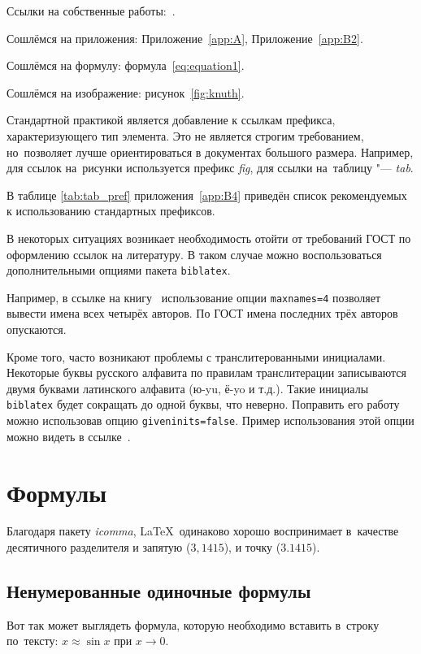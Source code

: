 Ссылки на собственные работы:~\cite{vakbib1, confbib1}.

Сошлёмся на приложения: Приложение~\cref{app:A}, Приложение~\cref{app:B2}.

Сошлёмся на формулу: формула~\cref{eq:equation1}.

Сошлёмся на изображение: рисунок~\cref{fig:knuth}.

Стандартной практикой является добавление к ссылкам префикса, характеризующего тип элемента.
Это не является строгим требованием, но~позволяет лучше ориентироваться в документах большого размера.
Например, для ссылок на~рисунки используется префикс \textit{fig},
для ссылки на~таблицу "--- \textit{tab}.

В таблице \cref{tab:tab_pref} приложения~\cref{app:B4} приведён список рекомендуемых
к использованию стандартных префиксов.

В некоторых ситуациях возникает необходимость отойти от требований ГОСТ по оформлению ссылок на
литературу.
В таком случае можно воспользоваться дополнительными опциями пакета \verb+biblatex+.

Например, в ссылке на книгу~\cite{sobenin_kdv} использование опции \verb+maxnames=4+ позволяет
вывести имена всех четырёх авторов.
По ГОСТ имена последних трёх авторов опускаются.

Кроме того, часто возникают проблемы с транслитерованными инициалами. Некоторые буквы русского
алфавита по правилам транслитерации записываются двумя буквами латинского алфавита (ю-yu, ё-yo и
т.д.).
Такие инициалы \verb+biblatex+ будет сокращать до одной буквы, что неверно.
Поправить его работу можно использовав опцию \verb+giveninits=false+.
Пример использования этой опции можно видеть в ссылке~\cite{initials}.

\section{Формулы}\label{sec:ch1/sec3}

Благодаря пакету \textit{icomma}, \LaTeX~одинаково хорошо воспринимает
в~качестве десятичного разделителя и запятую (\(3,1415\)), и точку (\(3.1415\)).

\subsection{Ненумерованные одиночные формулы}\label{subsec:ch1/sec3/sub1}

Вот так может выглядеть формула, которую необходимо вставить в~строку
по~тексту: \(x \approx \sin x\) при \(x \to 0\).


